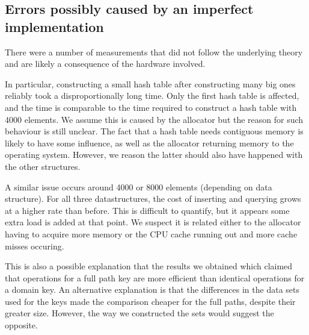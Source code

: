 \documentclass[12pt,a4paper]{article}
\begin{document}
    \subsection{Errors possibly caused by an imperfect implementation}

    There were a number of measurements that did not follow the underlying theory and are likely a
    consequence of the hardware involved.

    In particular, constructing a small hash table after constructing many big ones reliably took a
    disproportionally long time.  Only the first hash table is affected, and the time is comparable
    to the time required to construct a hash table with 4000 elements.  We assume this is caused by
    the allocator but the reason for such behaviour is still unclear.  The fact that a hash table
    needs contiguous memory is likely to have some influence, as well as the allocator returning
    memory to the operating system.  However, we reason the latter should also have happened with
    the other structures.

    A similar issue occurs around 4000 or 8000 elements (depending on data structure).  For all
    three datastructures, the cost of inserting and querying grows at a higher rate than before.
    This is difficult to quantify, but it appears some extra load is added at that point.  We suspect it is related
    either to the allocator having to acquire more memory or the CPU cache running out and more
    cache misses occuring.

    This is also a possible explanation that the results we obtained which claimed that operations
    for a full path key are more efficient than identical operations for a domain key.  An
    alternative explanation is that the differences in the data sets used for the keys made
    the comparison cheaper for the full paths, despite their greater size.  However, the way we
    constructed the sets would suggest the opposite.
\end{document}
